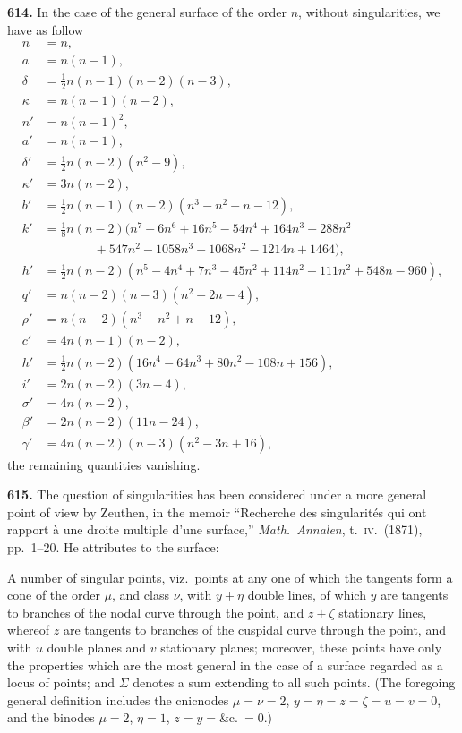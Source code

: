 \documentclass[11pt,a4paper]{article}
\newcommand{\artno}[1]{\textbf{#1.}\quad}
\begin{document}
\artno{614} In the case of the general surface of the order $n$, without
singularities, we have as follow
\begin{align*}
  n  & = n, \\
  a  & = n(n-1), \\
  \delta & = \tfrac{1}{2} n(n-1)(n-2)(n-3), \\
  \kappa & = n(n-1)(n-2), \\
  n' & = n(n-1)^{2}, \\
  a' & = n(n-1), \\
  \delta' & = \tfrac{1}{2} n(n-2)(n^{2}-9), \\
  \kappa' & = 3n(n-2), \\
  b' & = \tfrac{1}{2} n(n-1)(n-2)(n^{3} - n^{2} + n - 12), \\
  k' & = \tfrac{1}{8} n(n-2)(n^{7} - 6n^{6} + 16n^{5} - 54n^{4} + 164n^{3}
          - 288n^{2} \\
     & \qquad\qquad + 547n^{2} - 1058n^{3} + 1068n^{2} - 1214n + 1464), \\
  h' & = \tfrac{1}{2} n(n-2)(n^{5} - 4n^{4} + 7n^{3} - 45n^{2} + 114n^{2}
          - 111n^{2} + 548n - 960), \\
  q' & = n(n-2)(n-3)(n^{2} + 2n - 4), \\
  \rho' & = n(n-2)(n^{3} - n^{2} + n - 12), \\
  c' & = 4n(n-1)(n-2), \\
  h' & = \tfrac{1}{2} n(n-2)(16n^{4} - 64n^{3} + 80n^{2} - 108n + 156), \\
  i' & = 2n(n-2)(3n - 4), \\
  \sigma' & = 4n(n-2), \\
  \beta' & = 2n(n-2)(11n - 24), \\
  \gamma' & = 4n(n-2)(n-3)(n^{2} - 3n + 16),
\end{align*}
the remaining quantities vanishing.

\artno{615} The question of singularities has been considered under a more
general point of view by Zeuthen, in the memoir ``Recherche des singularit\'es
qui ont rapport \`a une droite multiple d'une surface,''
\emph{Math.\ Annalen}, t.\ \textsc{iv}.\ (1871), pp.\ 1--20.  He attributes
to the surface:

A number of singular points, viz.\ points at any one of which the tangents
form a cone of the order $\mu$, and class $\nu$, with $y + \eta$ double
lines, of which $y$ are tangents to branches of the nodal curve through the
point, and $z + \zeta$ stationary lines, whereof $z$ are tangents to branches
of the cuspidal curve through the point, and with $u$ double planes and $v$
stationary planes; moreover, these points have only the properties which are
the most general in the case of a surface regarded as a locus of points; and
$\Sigma$ denotes a sum extending to all such points.  (The foregoing general
definition includes the cnicnodes $\mu = \nu = 2$,
$y = \eta = z = \zeta = u = v = 0$, and the binodes $\mu = 2$, $\eta = 1$,
$z = y = \&\text{c}.\ = 0$.)
\end{document}
